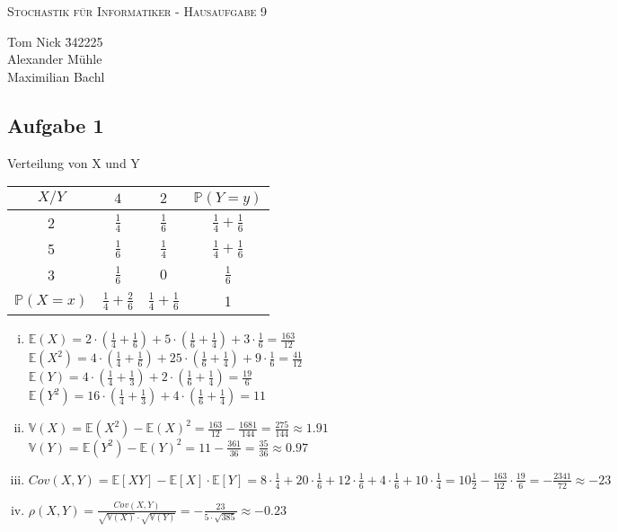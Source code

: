\documentclass[10pt,a4paper,parskip=half]{scrartcl}
\begin{document}
\begin{center}
\textsc{\Large{Stochastik für Informatiker - Hausaufgabe 9}} \\
\end{center}
\begin{tabbing}
Tom Nick \hspace{1.4cm}\= 342225\\
Alexander Mühle\\
Maximilian Bachl
\end{tabbing}
\subsection*{Aufgabe 1}
Verteilung von X und Y
\begin{tabular}{c | c c  | c}
$X/Y$ & $4$ & $2$ & $\mathbb{P}(Y=y) $\\ \hline
2 & $\frac{1}{4}$ & $\frac{1}{6}$ & $\frac{1}{4} + \frac{1}{6}$ \\
5 & $\frac{1}{6}$ & $\frac{1}{4}$ & $\frac{1}{4} + \frac{1}{6}$ \\
3 & $\frac{1}{6}$ & $0$ & $\frac{1}{6}$ \\ \hline
$\mathbb{P}(X=x)$ & $\frac{1}{4} + \frac{2}{6}$ & $\frac{1}{4} + \frac{1}{6}$ & 1
\end{tabular}
\begin{enumerate}[(i)]
\item
$\mathbb{E}(X) = 2 \cdot (\frac{1}{4}+\frac{1}{6}) + 5 \cdot (\frac{1}{6} + \frac{1}{4}) + 3 \cdot \frac{1}{6} = \frac{163}{12}$ \\
$\mathbb{E}(X^2) = 4 \cdot (\frac{1}{4}+\frac{1}{6}) + 25 \cdot (\frac{1}{6} + \frac{1}{4}) + 9 \cdot \frac{1}{6} = \frac{41}{12}$ \\
$\mathbb{E}(Y) = 4 \cdot (\frac{1}{4}+\frac{1}{3}) + 2 \cdot (\frac{1}{6} + \frac{1}{4}) = \frac{19}{6}$ \\
$\mathbb{E}(Y^2) = 16 \cdot (\frac{1}{4}+\frac{1}{3}) + 4 \cdot (\frac{1}{6} + \frac{1}{4}) = 11$ \\
\item
$\mathbb{V}(X) = \mathbb{E}(X^2) - \mathbb{E}(X)^2 = \frac{163}{12} - \frac{1681}{144} = \frac{275}{144} \approx 1.91$ \\
$\mathbb{V}(Y) = \mathbb{E}(Y^2) - \mathbb{E}(Y)^2 = 11 - \frac{361}{36} = \frac{35}{36} \approx 0.97$ \\
\item
$Cov(X,Y) = \mathbb{E}[XY] - \mathbb{E}[X] \cdot \mathbb{E}[Y] = 8\cdot \frac 1 4 + 20 \cdot \frac 1 6 + 12 \cdot \frac 1 6 + 4 \cdot \frac 1 6 + 10 \cdot \frac 1 4 = 10\frac 1 2 - \frac{163}{12} \cdot \frac{19}{6} = -\frac{2341}{72} \approx -23$ \\
\item
$\rho (X,Y) = \frac{Cov(X,Y)}{\sqrt{\mathbb{V}(X)} \cdot \sqrt{\mathbb{V}(Y)}} = -\frac{23}{5 \cdot \sqrt{385}} \approx - 0.23 $ \\
\end{enumerate}
\end{document}
